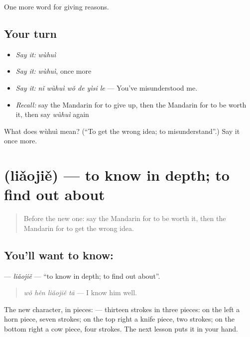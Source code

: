 \begin{grammarlens}[title={What you've built}]
One more word for giving reasons.
\end{grammarlens}

\subsection*{Your turn}
\begin{itemize}
\raggedright
  \item \emph{Say it:} \emph{wùhuì}
  \item \emph{Say it:} \emph{wùhuì}, once more
  \item \emph{Say it:} \emph{nǐ wùhuì wǒ de yìsi le} — You've misunderstood me.
  \item \emph{Recall:} say the Mandarin for to give up, then the Mandarin for to be worth it, then say \emph{wùhuì} again
\end{itemize}

\begin{tcolorbox}[breakable,colback=teal!4,colframe=teal!35!black,title={Before you move on}]
What does wùhuì mean? (\textquotedblleft{}To get the wrong idea; to misunderstand\textquotedblright{}.) Say it once more.
\end{tcolorbox}
\section[\texorpdfstring{\zh{了解} (liǎojiě)}{了解 (liǎojiě)}]{ (liǎojiě) — to know in depth; to find out about}

\label{lesson:ZH-C367-liaojie}



\begin{quote}
Before the new one: say the Mandarin for to be worth it, then the Mandarin for to get the wrong idea.
\end{quote}

\subsection*{You'll want to know: }
\textbf{} — \emph{liǎojiě} — \textquotedblleft{}to know in depth; to find out about\textquotedblright{}.

\begin{quote}
\textbf{} \emph{wǒ hěn liǎojiě tā} — I know him well.
\end{quote}

The new character, in pieces:  — thirteen strokes in three pieces: on the left a horn piece, seven strokes; on the top right a knife piece, two strokes; on the bottom right a cow piece, four strokes. The next lesson puts it in your hand.

